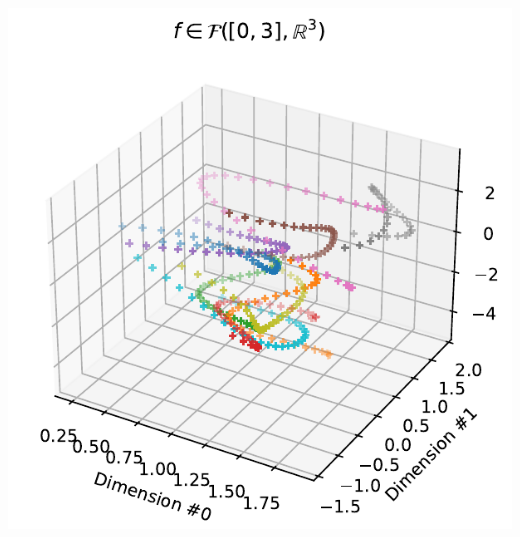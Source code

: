 \documentclass{beamer}
\begin{document}
\begin{frame}
\begin{columns}
    \hspace{-0.5cm}
    \includegraphics[width=.99\textwidth]{figures/scatter_3d.pdf}

\end{columns}
\end{frame}
\end{document}
